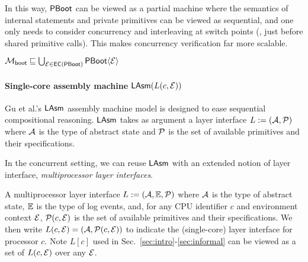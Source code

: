 In this way, $\mathsf{PBoot}$ can be viewed as a partial machine
where the semantics of internal statements
and private primitives can be viewed as sequential,
and one only needs to consider concurrency
and interleaving at switch points (\ie, just before 
shared primitive calls).
This makes concurrency verification far more scalable.
\begin{lemma}
\begin{small}
$
		\mathcal{M}_{\mathsf{boot}} \sqsubseteq \bigcup_{\mathcal{E} \in \mathsf{EC}(\mathsf{PBoot})}{\mathsf{PBoot}\langle \mathcal{E} \rangle}
$
\end{small}
 \label{lemma:pboot}
\end{lemma}




\paragraph{Single-core assembly machine $\mathsf{LAsm}(L(c,\mathcal{E}))$}
Gu et al.'s $\mathsf{LAsm}$ assembly machine model \cite[\S 5]{dscal15} is
designed to ease sequential compositional reasoning. $\mathsf{LAsm}$ takes as
argument a layer interface $L := (\mathcal{A}, \mathcal{P})$ where $\mathcal{A}$ is the type of abstract state and
$\mathcal{P}$ is the set of available primitives and their specifications.

In the concurrent setting, we can reuse $\mathsf{LAsm}$ with an extended
notion of layer interface, \emph{multiprocessor layer interfaces}.

\begin{definition}
A multiprocessor layer interface $L := (\mathcal{A}, \mathbb{E}, \mathcal{P})$ where $\mathcal{A}$ is the type of abstract state, 
$\mathbb{E}$ is the type of log events, and, for any CPU identifier $c$ and environment 
context $\mathcal{E}$, $\mathcal{P}(c, \mathcal{E})$ is the set of 
available primitives and their 
specifications. We then write $L(c, \mathcal{E}) = (\mathcal{A}, \mathcal{P}(c, \mathcal{E}))$ to indicate the 
(single-core) layer interface for processor $c$.
Note $L[c]$ used in Sec.~\ref{sec:intro}-\ref{sec:informal}
can be viewed as a set of $L(c,\mathcal{E})$ over any $\mathcal{E}$.  
\end{definition}

